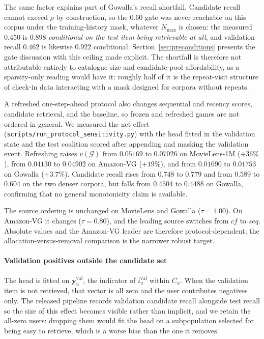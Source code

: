 \documentclass[pdflatex,sn-basic,Numbered]{sn-jnl}
\theoremstyle{plain}
\theoremstyle{definition}
\newcommand{\G}{\mathcal{G}}
\begin{document}
The same factor explains part of Gowalla's recall shortfall. Candidate recall
cannot exceed $\rho$ by construction, so the $0.60$ gate was never reachable
on this corpus under the training-history mask, whatever $N_{\max}$ is chosen:
the measured $0.450$ is $0.898$ \emph{conditional on the test item being
retrievable at all}, and validation recall $0.462$ is likewise $0.922$
conditional. Section~\ref{sec:preconditions} presents the gate discussion with
this ceiling made explicit. The shortfall is therefore not attributable
entirely to catalogue size and candidate-pool affordability, as a
sparsity-only reading would have it: roughly half of it is the repeat-visit
structure of check-in data interacting with a mask designed for corpora
without repeats.

A refreshed one-step-ahead protocol also changes sequential and recency scores,
candidate retrieval, and the baseline, so frozen and refreshed games are not
ordered in general. We measured the net effect
(\texttt{scripts/run\_protocol\_sensitivity.py}) with the head fitted in the
validation state and the test coalition scored after appending and masking the
validation event. Refreshing raises $v(\G)$ from $0.05169$ to $0.07026$ on
MovieLens-1M ($+36\%$), from $0.04130$ to $0.04902$ on Amazon-VG ($+19\%$), and
from $0.01690$ to $0.01753$ on Gowalla ($+3.7\%$). Candidate recall rises from
$0.748$ to $0.779$ and from $0.589$ to $0.604$ on the two denser corpora, but
falls from $0.4504$ to $0.4488$ on Gowalla, confirming that no general
monotonicity claim is available.

The source ordering is unchanged on MovieLens and Gowalla
($\tau=1.00$). On Amazon-VG it changes ($\tau=0.80$), and the leading source
switches from $cf$ to $seq$. Absolute values and the Amazon-VG leader are
therefore protocol-dependent; the allocation-versus-removal comparison is the
narrower robust target.

\paragraph{Validation positives outside the candidate set}
The head is fitted on $\mathbf{y}^{\mathrm{val}}_u$, the indicator of
$i_u^{\mathrm{val}}$ within $C_u$. When the validation item is not retrieved,
that vector is all zero and the user contributes negatives only. The released pipeline records validation candidate recall alongside test recall
so the size of this effect becomes visible rather than implicit, and we retain
the all-zero users: dropping them would fit the head on a subpopulation
selected for being easy to retrieve, which is a worse bias than the one it
removes.
\end{document}
